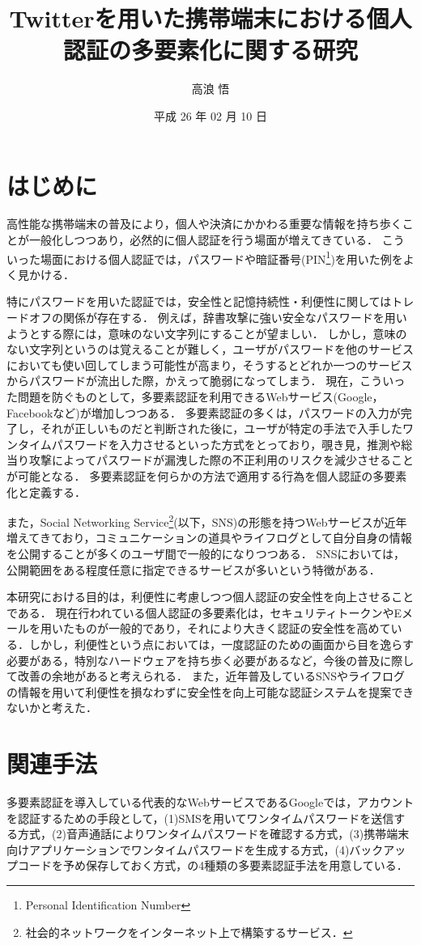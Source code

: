 \documentclass[twocolumn, a4paper, 9pt]{UECIEresume}
\title{Twitterを用いた携帯端末における個人認証の多要素化に関する研究}
\date{平成 26 年 02 月 10 日}
\affiliation{総合情報学科 セキュリティ情報学 コース}
\author{高浪 悟}
\begin{document}
\maketitle

\section{はじめに}
高性能な携帯端末の普及により，個人や決済にかかわる重要な情報を持ち歩くことが一般化しつつあり，必然的に個人認証を行う場面が増えてきている．
こういった場面における個人認証では，パスワードや暗証番号(PIN\footnote{Personal Identification Number})を用いた例をよく見かける．

特にパスワードを用いた認証では，安全性と記憶持続性・利便性に関してはトレードオフの関係が存在する．
例えば，辞書攻撃に強い安全なパスワードを用いようとする際には，意味のない文字列にすることが望ましい．
しかし，意味のない文字列というのは覚えることが難しく，ユーザがパスワードを他のサービスにおいても使い回してしまう可能性が高まり，そうするとどれか一つのサービスからパスワードが流出した際，かえって脆弱になってしまう．
現在，こういった問題を防ぐものとして，多要素認証を利用できるWebサービス(Google，Facebookなど)が増加しつつある．
多要素認証の多くは，パスワードの入力が完了し，それが正しいものだと判断された後に，ユーザが特定の手法で入手したワンタイムパスワードを入力させるといった方式をとっており，覗き見，推測や総当り攻撃によってパスワードが漏洩した際の不正利用のリスクを減少させることが可能となる．
多要素認証を何らかの方法で適用する行為を個人認証の多要素化と定義する．

また，Social Networking Service\footnote{社会的ネットワークをインターネット上で構築するサービス．}(以下，SNS)の形態を持つWebサービスが近年増えてきており，コミュニケーションの道具やライフログとして自分自身の情報を公開することが多くのユーザ間で一般的になりつつある．
SNSにおいては，公開範囲をある程度任意に指定できるサービスが多いという特徴がある．

本研究における目的は，利便性に考慮しつつ個人認証の安全性を向上させることである．
現在行われている個人認証の多要素化は，セキュリティトークンやEメールを用いたものが一般的であり，それにより大きく認証の安全性を高めている．しかし，利便性という点においては，一度認証のための画面から目を逸らす必要がある，特別なハードウェアを持ち歩く必要があるなど，今後の普及に際して改善の余地があると考えられる．
また，近年普及しているSNS\cite{soumuWhitepaper2013Social}やライフログの情報を用いて利便性を損なわずに安全性を向上可能な認証システムを提案できないかと考えた．

\section{関連手法}
多要素認証を導入している代表的なWebサービスであるGoogleでは，アカウントを認証するための手段として，(1)SMSを用いてワンタイムパスワードを送信する方式，(2)音声通話によりワンタイムパスワードを確認する方式，(3)携帯端末向けアプリケーションでワンタイムパスワードを生成する方式，(4)バックアップコードを予め保存しておく方式，の4種類の多要素認証手法を用意している\cite{google}．
\end{document}
